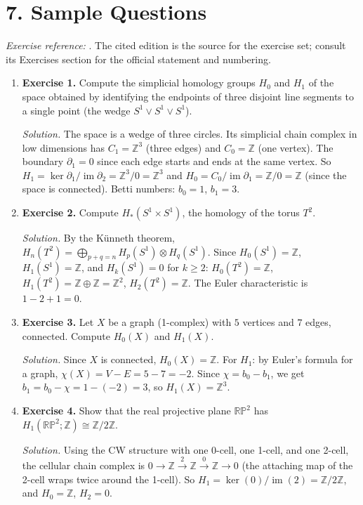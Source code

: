 \section*{7. Sample Questions}
\emph{Exercise reference:} \cite{homology_theory_ref1}. The cited edition is the source for the exercise set; consult its Exercises section for the official statement and numbering.
\begin{enumerate}[leftmargin=*,itemsep=0.9em]
\item \textbf{Exercise 1.} Compute the simplicial homology groups $H_0$ and $H_1$ of the space obtained by identifying the endpoints of three disjoint line segments to a single point (the wedge $S^1\vee S^1\vee S^1$).

\emph{Solution.} The space is a wedge of three circles. Its simplicial chain complex in low dimensions has $C_1=\mathbb{Z}^3$ (three edges) and $C_0=\mathbb{Z}$ (one vertex). The boundary $\partial_1=0$ since each edge starts and ends at the same vertex. So $H_1=\ker\partial_1/\operatorname{im}\partial_2=\mathbb{Z}^3/0=\mathbb{Z}^3$ and $H_0=C_0/\operatorname{im}\partial_1=\mathbb{Z}/0=\mathbb{Z}$ (since the space is connected). Betti numbers: $b_0=1$, $b_1=3$.

\item \textbf{Exercise 2.} Compute $H_*(S^1\times S^1)$, the homology of the torus $T^2$.

\emph{Solution.} By the K\"{u}nneth theorem, $H_n(T^2)=\bigoplus_{p+q=n}H_p(S^1)\otimes H_q(S^1)$. Since $H_0(S^1)=\mathbb{Z}$, $H_1(S^1)=\mathbb{Z}$, and $H_k(S^1)=0$ for $k\geq 2$: $H_0(T^2)=\mathbb{Z}$, $H_1(T^2)=\mathbb{Z}\oplus\mathbb{Z}=\mathbb{Z}^2$, $H_2(T^2)=\mathbb{Z}$. The Euler characteristic is $1-2+1=0$.

\item \textbf{Exercise 3.} Let $X$ be a graph (1-complex) with $5$ vertices and $7$ edges, connected. Compute $H_0(X)$ and $H_1(X)$.

\emph{Solution.} Since $X$ is connected, $H_0(X)=\mathbb{Z}$. For $H_1$: by Euler's formula for a graph, $\chi(X)=V-E=5-7=-2$. Since $\chi=b_0-b_1$, we get $b_1=b_0-\chi=1-(-2)=3$, so $H_1(X)=\mathbb{Z}^3$.

\item \textbf{Exercise 4.} Show that the real projective plane $\mathbb{RP}^2$ has $H_1(\mathbb{RP}^2;\mathbb{Z})\cong\mathbb{Z}/2\mathbb{Z}$.

\emph{Solution.} Using the CW structure with one 0-cell, one 1-cell, and one 2-cell, the cellular chain complex is $0\to\mathbb{Z}\xrightarrow{2}\mathbb{Z}\xrightarrow{0}\mathbb{Z}\to 0$ (the attaching map of the 2-cell wraps twice around the 1-cell). So $H_1=\ker(0)/\operatorname{im}(2)=\mathbb{Z}/2\mathbb{Z}$, and $H_0=\mathbb{Z}$, $H_2=0$.


\end{enumerate}
